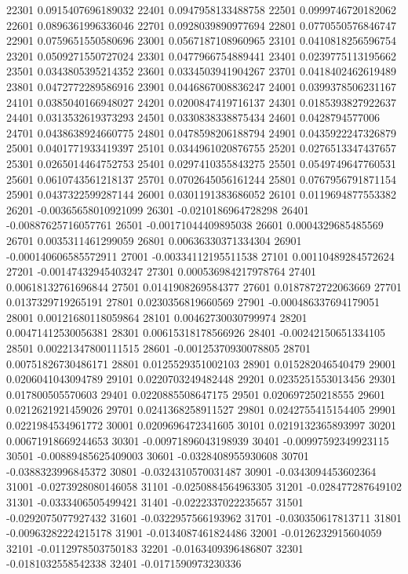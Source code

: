 {22301 0.0915407696189032
22401 0.0947958133488758
22501 0.0999746720182062
22601 0.0896361996336046
22701 0.0928039890977694
22801 0.0770550576846747
22901 0.0759651550580696
23001 0.0567187108960965
23101 0.0410818256596754
23201 0.0509271550727024
23301 0.0477966754889441
23401 0.0239775113195662
23501 0.0343805395214352
23601 0.0334503941904267
23701 0.0418402462619489
23801 0.0472772289586916
23901 0.0446867008836247
24001 0.0399378506231167
24101 0.0385040166948027
24201 0.0200847419716137
24301 0.0185393827922637
24401 0.0313532619373293
24501 0.0330838338875434
24601 0.0428794577006
24701 0.0438638924660775
24801 0.0478598206188794
24901 0.0435922247326879
25001 0.0401771933419397
25101 0.0344961020876755
25201 0.0276513347437657
25301 0.0265014464752753
25401 0.0297410355843275
25501 0.0549749647760531
25601 0.0610743561218137
25701 0.0702645056161244
25801 0.0767956791871154
25901 0.0437322599287144
26001 0.0301191383686052
26101 0.0119694877553382
26201 -0.00365658010921099
26301 -0.0210186964728298
26401 -0.00887625716057761
26501 -0.00171044409895038
26601 0.0004329685485569
26701 0.0035311461299059
26801 0.00636330371334304
26901 -0.000140606585572911
27001 -0.00334112195511538
27101 0.00110489284572624
27201 -0.00147432945403247
27301 0.000536984217978764
27401 0.00618132761696844
27501 0.0141908269584377
27601 0.0187872722063669
27701 0.0137329719265191
27801 0.0230356819660569
27901 -0.000486337694179051
28001 0.00121680118059864
28101 0.00462730030799974
28201 0.00471412530056381
28301 0.00615318178566926
28401 -0.00242150651334105
28501 0.00221347800111515
28601 -0.00125370930078805
28701 0.00751826730486171
28801 0.0125529351002103
28901 0.015282046540479
29001 0.0206041043094789
29101 0.0220703249482448
29201 0.0235251553013456
29301 0.017800505570603
29401 0.0220885508647175
29501 0.020697250218555
29601 0.0212621921459026
29701 0.0241368258911527
29801 0.0242755415154405
29901 0.0221984534961772
30001 0.0209696472341605
30101 0.0219132365893997
30201 0.00671918669244653
30301 -0.00971896043198939
30401 -0.00997592349923115
30501 -0.00889485625409003
30601 -0.0328408955930608
30701 -0.0388323996845372
30801 -0.0324310570031487
30901 -0.0343094453602364
31001 -0.0273928080146058
31101 -0.0250884564963305
31201 -0.028477287649102
31301 -0.0333406505499421
31401 -0.0222337022235657
31501 -0.0292075077927432
31601 -0.0322957566193962
31701 -0.030350617813711
31801 -0.00963282224215178
31901 -0.0134087461824486
32001 -0.0126232915604059
32101 -0.0112978503750183
32201 -0.0163409396486807
32301 -0.0181032558542338
32401 -0.0171590973230336
}
